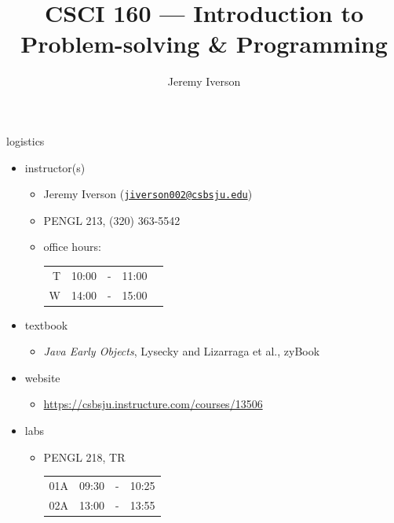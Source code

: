 \documentclass[10pt]{beamer}
\title{CSCI 160 --- Introduction to Problem-solving \& Programming}
\date{}
\author{Jeremy Iverson}
\institute{College of Saint Benedict \& Saint John's University}
\begin{document}
  \maketitle

  \begin{frame}{logistics}
    \begin{itemize}
      \item instructor(s)
        \begin{itemize}
          \item Jeremy Iverson (\href{mailto:jiverson002@csbsju.edu}{\nolinkurl{jiverson002@csbsju.edu}})
          \item PENGL 213, (320) 363-5542
          \item office hours: \begin{tabular}[t]{rrrcr}
                                T & 10:00 & - & 11:00 \\
                                W & 14:00 & - & 15:00
                              \end{tabular}
        \end{itemize}
      \item textbook
        \begin{itemize}
          \item \emph{Java Early Objects}, Lysecky and Lizarraga et al., zyBook
        \end{itemize}
      \item website
        \begin{itemize}
          \item \url{https://csbsju.instructure.com/courses/13506}
        \end{itemize}
      \item labs
        \begin{itemize}
          \item PENGL 218, TR \begin{tabular}[t]{rrcr}
                                01A & 09:30 & - & 10:25 \\
                                02A & 13:00 & - & 13:55
                              \end{tabular}
        \end{itemize}
    \end{itemize}

  \end{frame}
\end{document}
